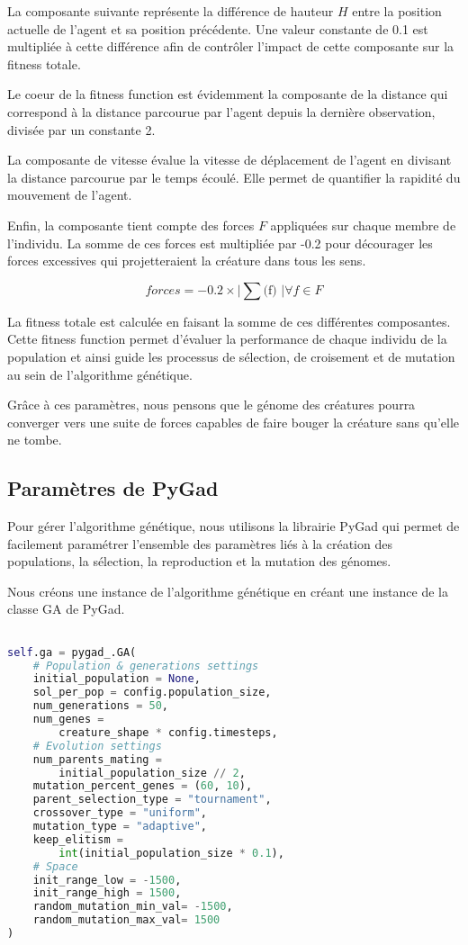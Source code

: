 \documentclass[journal, a4paper]{IEEEtran}
\begin{document}
La composante suivante représente la différence de hauteur $H$ entre la position actuelle de l'agent et sa position précédente. Une valeur constante de 0.1 est multipliée à cette différence afin de contrôler l'impact de cette composante sur la fitness totale.

Le coeur de la fitness function est évidemment la composante de la distance qui correspond à la distance parcourue par l'agent depuis la dernière observation, divisée par un constante 2.

La composante de vitesse évalue la vitesse de déplacement de l'agent en divisant la distance parcourue par le temps écoulé. Elle permet de quantifier la rapidité du mouvement de l'agent.

Enfin, la composante  tient compte des forces $F$ appliquées sur chaque membre de l'individu. La somme de ces forces est multipliée par -0.2 pour décourager les forces excessives qui projetteraient la créature dans tous les sens.

\begin{equation} 
    forces = -0.2 \times \lvert \sum \text{{(f)   }} \rvert \forall f \in F
\end{equation}

La fitness totale est calculée en faisant la somme de ces différentes composantes. Cette fitness function permet d'évaluer la performance de chaque individu de la population et ainsi guide les processus de sélection, de croisement et de mutation au sein de l'algorithme génétique. 

Grâce à ces paramètres, nous pensons que le génome des créatures pourra converger vers une suite de forces capables de faire bouger la créature sans qu'elle ne tombe.


\subsection{Paramètres de PyGad}

Pour gérer l'algorithme génétique, nous utilisons la librairie PyGad \cite{PyGad} qui permet de facilement paramétrer l'ensemble des paramètres liés à la création des populations, la sélection, la reproduction et la mutation des génomes.

Nous créons une instance de l'algorithme génétique en créant une instance de la classe GA de PyGad.

\begin{lstlisting}[language=Python]

self.ga = pygad_.GA(
    # Population & generations settings
    initial_population = None,
    sol_per_pop = config.population_size,
    num_generations = 50,
    num_genes =
        creature_shape * config.timesteps,
    # Evolution settings
    num_parents_mating =
        initial_population_size // 2,
    mutation_percent_genes = (60, 10),
    parent_selection_type = "tournament",
    crossover_type = "uniform",
    mutation_type = "adaptive",
    keep_elitism =
        int(initial_population_size * 0.1),
    # Space
    init_range_low = -1500,
    init_range_high = 1500,
    random_mutation_min_val= -1500,
    random_mutation_max_val= 1500
)
\end{lstlisting}
\end{document}
